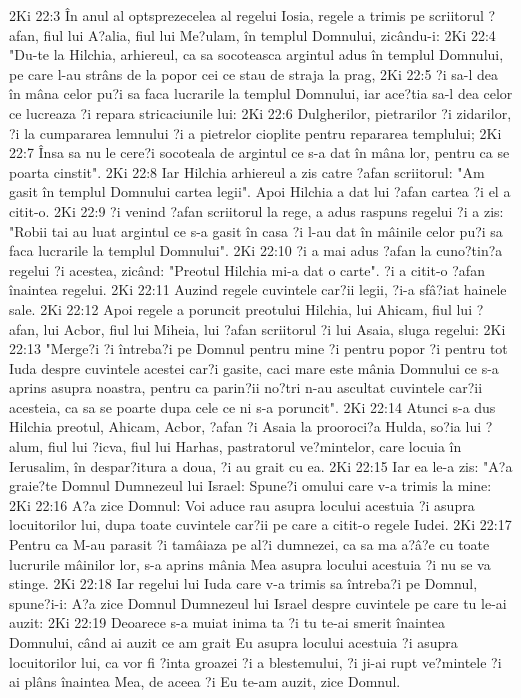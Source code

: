 2Ki 22:3  În anul al optsprezecelea al regelui Iosia, regele a trimis pe scriitorul ?afan, fiul lui A?alia, fiul lui Me?ulam, în templul Domnului, zicându-i:
2Ki 22:4  "Du-te la Hilchia, arhiereul, ca sa socoteasca argintul adus în templul Domnului, pe care l-au strâns de la popor cei ce stau de straja la prag,
2Ki 22:5  ?i sa-l dea în mâna celor pu?i sa faca lucrarile la templul Domnului, iar ace?tia sa-l dea celor ce lucreaza ?i repara stricaciunile lui:
2Ki 22:6  Dulgherilor, pietrarilor ?i zidarilor, ?i la cumpararea lemnului ?i a pietrelor cioplite pentru repararea templului;
2Ki 22:7  Însa sa nu le cere?i socoteala de argintul ce s-a dat în mâna lor, pentru ca se poarta cinstit".
2Ki 22:8  Iar Hilchia arhiereul a zis catre ?afan scriitorul: "Am gasit în templul Domnului cartea legii". Apoi Hilchia a dat lui ?afan cartea ?i el a citit-o.
2Ki 22:9  ?i venind ?afan scriitorul la rege, a adus raspuns regelui ?i a zis: "Robii tai au luat argintul ce s-a gasit în casa ?i l-au dat în mâinile celor pu?i sa faca lucrarile la templul Domnului".
2Ki 22:10  ?i a mai adus ?afan la cuno?tin?a regelui ?i acestea, zicând: "Preotul Hilchia mi-a dat o carte". ?i a citit-o ?afan înaintea regelui.
2Ki 22:11  Auzind regele cuvintele car?ii legii, ?i-a sfâ?iat hainele sale.
2Ki 22:12  Apoi regele a poruncit preotului Hilchia, lui Ahicam, fiul lui ?afan, lui Acbor, fiul lui Miheia, lui ?afan scriitorul ?i lui Asaia, sluga regelui:
2Ki 22:13  "Merge?i ?i întreba?i pe Domnul pentru mine ?i pentru popor ?i pentru tot Iuda despre cuvintele acestei car?i gasite, caci mare este mânia Domnului ce s-a aprins asupra noastra, pentru ca parin?ii no?tri n-au ascultat cuvintele car?ii acesteia, ca sa se poarte dupa cele ce ni s-a poruncit".
2Ki 22:14  Atunci s-a dus Hilchia preotul, Ahicam, Acbor, ?afan ?i Asaia la prooroci?a Hulda, so?ia lui ?alum, fiul lui ?icva, fiul lui Harhas, pastratorul ve?mintelor, care locuia în Ierusalim, în despar?itura a doua, ?i au grait cu ea.
2Ki 22:15  Iar ea le-a zis: "A?a graie?te Domnul Dumnezeul lui Israel: Spune?i omului care v-a trimis la mine:
2Ki 22:16  A?a zice Domnul: Voi aduce rau asupra locului acestuia ?i asupra locuitorilor lui, dupa toate cuvintele car?ii pe care a citit-o regele Iudei.
2Ki 22:17  Pentru ca M-au parasit ?i tamâiaza pe al?i dumnezei, ca sa ma a?â?e cu toate lucrurile mâinilor lor, s-a aprins mânia Mea asupra locului acestuia ?i nu se va stinge.
2Ki 22:18  Iar regelui lui Iuda care v-a trimis sa întreba?i pe Domnul, spune?i-i: A?a zice Domnul Dumnezeul lui Israel despre cuvintele pe care tu le-ai auzit:
2Ki 22:19  Deoarece s-a muiat inima ta ?i tu te-ai smerit înaintea Domnului, când ai auzit ce am grait Eu asupra locului acestuia ?i asupra locuitorilor lui, ca vor fi ?inta groazei ?i a blestemului, ?i ji-ai rupt ve?mintele ?i ai plâns înaintea Mea, de aceea ?i Eu te-am auzit, zice Domnul.
